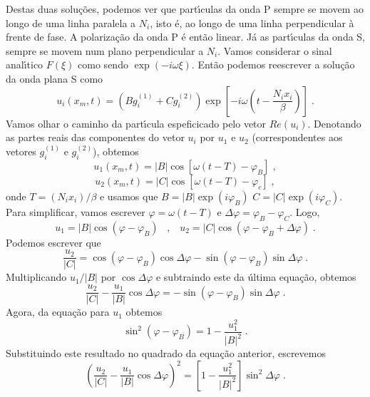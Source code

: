 Destas duas solu\c{c}\~oes, podemos ver que part\'{\i}culas da
onda P sempre se movem ao longo de uma linha paralela a $N_i$,
isto \'e, ao longo de uma linha perpendicular \`a frente de fase.
A polariza\c{c}\~ao da onda P \'e ent\~ao linear. J\'a as
part\'{\i}culas da onda S, sempre se movem num plano perpendicular
a $N_i$. Vamos considerar o sinal anal\'{\i}tico $F(\xi)$ como
sendo $\exp{(-i\omega \xi)}$. Ent\~ao podemos reescrever a
solu\c{c}\~ao da onda plana S como
\begin{equation}
u_i(x_m,t)=(Bg_i^{(1)}+Cg_i^{(2)})\exp\left[-i\omega
\left(t-\frac{N_ix_i}{\beta} \right)\right] \;.
\end{equation}
Vamos olhar o caminho da part\'{\i}cula espeficicado pelo vetor
$Re(u_i)$. Denotando as partes reais das componentes do vetor
$u_i$ por $u_1$ e $u_2$ (correspondentes aos vetores $g_i^{(1)}$ e
$g_i^{(2)}$), obtemos
\begin{equation}
u_1(x_m,t)=|B| \cos [\omega(t-T)-\varphi_B] \;,
\end{equation}
\begin{equation}
u_2(x_m,t)=|C| \cos [\omega(t-T)-\varphi_c] \;,
\end{equation}
onde $T=(N_ix_i)/\beta$ e usamos que $B=|B|\exp{(i \varphi_B)}$
$C=|C|\exp{(i \varphi_C)}$. Para simplificar, vamos escrever
$\varphi=\omega(t-T)$ e $\Delta \varphi=\varphi_B-\varphi_C$.
Logo,
\begin{equation}
u_1=|B| \cos (\varphi-\varphi_B) \;\;\;,\;\;\;u_2=|C| \cos
(\varphi-\varphi_B+\Delta\varphi)\;.
\end{equation}
Podemos escrever que
\begin{equation}
\frac{u_2}{|C|}=\cos(\varphi-\varphi_B)\cos\Delta\varphi-\sin(\varphi-\varphi_B)\sin\Delta\varphi\;.
\end{equation}
Multiplicando $u_1/|B|$ por $\cos\Delta\varphi$ e subtraindo este
da \'ultima equa\c{c}\~ao, obtemos
\begin{equation}
\frac{u_2}{|C|}-\frac{u_1}{|B|}\cos\Delta\varphi=-\sin(\varphi-\varphi_B)\sin\Delta\varphi
\;.
\end{equation}
Agora, da equa\c{c}\~ao para $u_1$ obtemos
\begin{equation}
\sin^2(\varphi-\varphi_B)=1-\frac{u_1^2}{|B|^2}\;.
\end{equation}
Substituindo este resultado no quadrado da equa\c{c}\~ao anterior,
escrevemos
\begin{equation}
\left(\frac{u_2}{|C|}-\frac{u_1}{|B|}\cos\Delta\varphi\right)^2=\left[1-\frac{u_1^2}{|B|^2}\right]\sin^2\Delta\varphi
\;.
\end{equation}
